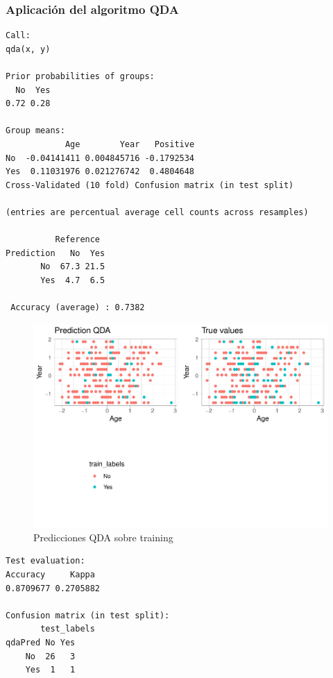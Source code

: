 \subsubsection{Aplicación del algoritmo QDA}

\begin{verbatim}
Call:
qda(x, y)

Prior probabilities of groups:
  No  Yes 
0.72 0.28 

Group means:
            Age        Year   Positive
No  -0.04141411 0.004845716 -0.1792534
Yes  0.11031976 0.021276742  0.4804648
Cross-Validated (10 fold) Confusion matrix (in test split) 

(entries are percentual average cell counts across resamples)
 
          Reference
Prediction   No  Yes
       No  67.3 21.5
       Yes  4.7  6.5
                            
 Accuracy (average) : 0.7382
\end{verbatim}

\begin{figure}[H]\center\includegraphics[width=.9\linewidth]{img/Clasificacion_files/figure-latex/unnamed-chunk-30-1}\caption{Predicciones QDA sobre training}\end{figure}


\begin{verbatim}
Test evaluation:
Accuracy     Kappa 
0.8709677 0.2705882

Confusion matrix (in test split):
       test_labels
qdaPred No Yes
    No  26   3
    Yes  1   1
\end{verbatim}


